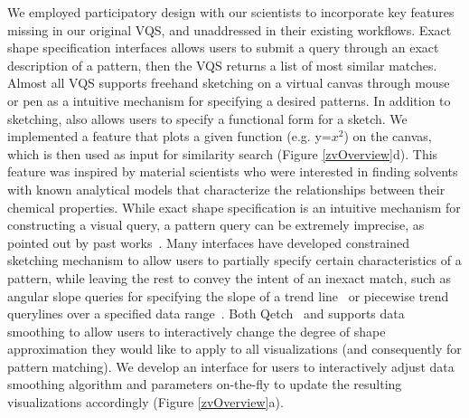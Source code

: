 \par We employed participatory design with our scientists to incorporate key features missing in our original VQS, and unaddressed in their existing workflows. %
Exact shape specification interfaces allows users to submit a query through an exact description of a pattern, then the VQS returns a list of most similar matches. Almost all VQS supports freehand sketching on a virtual canvas through mouse or pen as a intuitive mechanism for specifying a desired patterns. In addition to sketching, \zv also allows users to specify a functional form for a sketch. We implemented a feature that plots a given function (e.g. y=$x^2$) on the canvas, which is then used as input for similarity search (Figure \ref{zvOverview}d). This feature was inspired by material scientists who were interested in finding solvents with known analytical models that characterize the relationships between their chemical properties.
While exact shape specification is an intuitive mechanism for constructing a visual query, a pattern query can be extremely imprecise, as pointed out by past works~\cite{correll2016semantics,Holz2009}. Many interfaces have developed constrained sketching mechanism to allow users to partially specify certain characteristics of a pattern, while leaving the rest to convey the intent of an inexact match, such as angular slope queries for specifying the slope of a trend line~\cite{Hochheiser2004} or piecewise trend querylines over a specified data range~\cite{ryall2005querylines}. Both Qetch~\cite{Mannino2018} and \zv supports data smoothing to allow users to interactively change the degree of shape approximation they would like to apply to all visualizations (and consequently for pattern matching). We develop an interface for users to interactively adjust data smoothing algorithm and parameters on-the-fly to update the resulting visualizations accordingly (Figure \ref{zvOverview}a).
